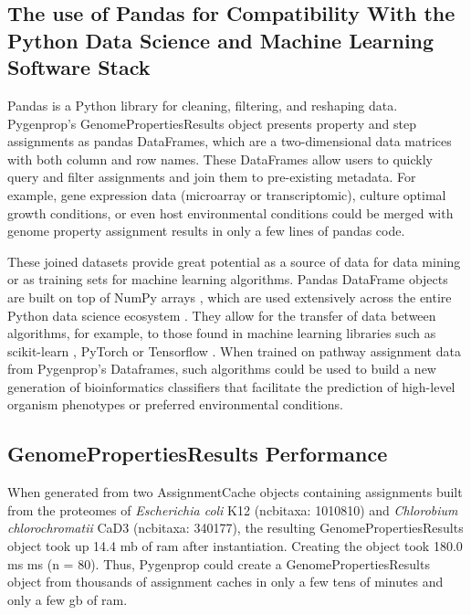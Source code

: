 \subsection{The use of Pandas for Compatibility With the Python Data Science and 
Machine Learning Software Stack}

Pandas is a Python library for cleaning, filtering, and reshaping data. 
Pygenprop's GenomePropertiesResults object presents property and step 
assignments as pandas DataFrames, which are a two-dimensional data matrices with 
both column and row names. These DataFrames allow users to quickly query and 
filter assignments and join them to pre-existing metadata. For example, gene 
expression data (microarray or transcriptomic), culture optimal growth 
conditions, or even host environmental conditions could be merged with genome 
property assignment results in only a few lines of pandas code.

These joined datasets provide great potential as a source of data for data 
mining or as training sets for machine learning algorithms. Pandas DataFrame 
objects are built on top of NumPy arrays \cite{mckinney2010data}, which are used 
extensively across the entire Python data science ecosystem \cite{scipystack}. 
They allow for the transfer of data between algorithms, for example, to those 
found in machine learning libraries such as \gls{scikit}-learn 
\cite{pedregosa2011scikit}, PyTorch \cite{Paszke2017} or Tensorflow 
\cite{abadi2016tensorflow}.  When trained on pathway assignment data from 
Pygenprop's Dataframes, such algorithms could be used to build a new generation 
of bioinformatics classifiers that facilitate the prediction of high-level 
organism phenotypes or preferred environmental conditions.

\subsection{GenomePropertiesResults Performance}

When generated from two AssignmentCache objects containing assignments built 
from the proteomes of \textit{Escherichia coli} K12 (\gls{ncbitaxa}: 1010810) 
and \textit{Chlorobium chlorochromatii} CaD3 (\gls{ncbitaxa}: 340177), the 
resulting GenomePropertiesResults object took up 14.4 \gls{mb} of \gls{ram} 
after instantiation. Creating the object took 180.0 ms  ms (\gls{n} 
= 80). Thus, Pygenprop could create a GenomePropertiesResults object from 
thousands of assignment caches in only a few tens of minutes and only a few 
\gls{gb}  of \gls{ram}. 

